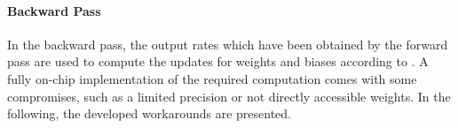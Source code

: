 
\paragraph{Backward Pass}
In the backward pass, the output rates which have been obtained by the forward pass are used to compute the updates for weights and biases according to . A fully on-chip implementation of the required computation comes with some compromises, such as a limited precision or not directly accessible weights. In the following, the developed workarounds are presented.

